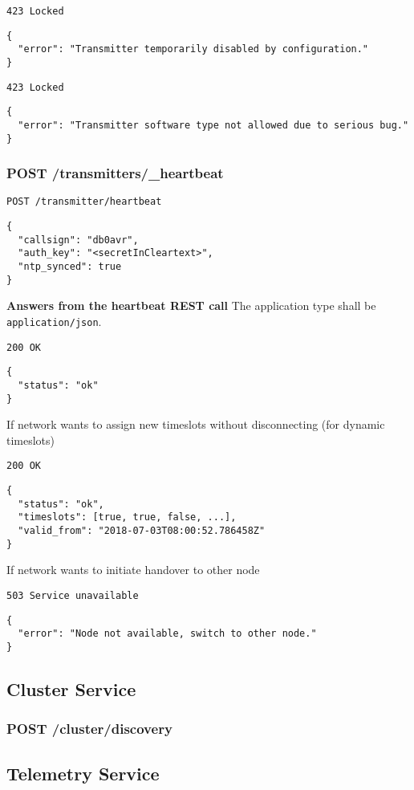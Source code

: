 \texttt{423 Locked}
\begin{lstlisting}
{
  "error": "Transmitter temporarily disabled by configuration."
}
\end{lstlisting}

\texttt{423 Locked}
\begin{lstlisting}
{
  "error": "Transmitter software type not allowed due to serious bug."
}
\end{lstlisting}


\subsubsection{POST /transmitters/\_heartbeat}
\texttt{POST /transmitter/heartbeat}
\begin{lstlisting}
{
  "callsign": "db0avr",
  "auth_key": "<secretInCleartext>",
  "ntp_synced": true
}
\end{lstlisting}

\textbf{Answers from the heartbeat REST call}
The application type shall be \verb|application/json|.

\texttt{200 OK}
\begin{lstlisting}
{
  "status": "ok"
}
\end{lstlisting}

If network wants to assign new timeslots without disconnecting (for dynamic timeslots)

\texttt{200 OK}
\begin{lstlisting}
{
  "status": "ok",
  "timeslots": [true, true, false, ...],
  "valid_from": "2018-07-03T08:00:52.786458Z"
}
\end{lstlisting}

If network wants to initiate handover to other node

\texttt{503 Service unavailable}
\begin{lstlisting}
{
  "error": "Node not available, switch to other node."
}
\end{lstlisting}


\subsection{Cluster Service}

\subsubsection{POST /cluster/discovery}


\subsection{Telemetry Service}

